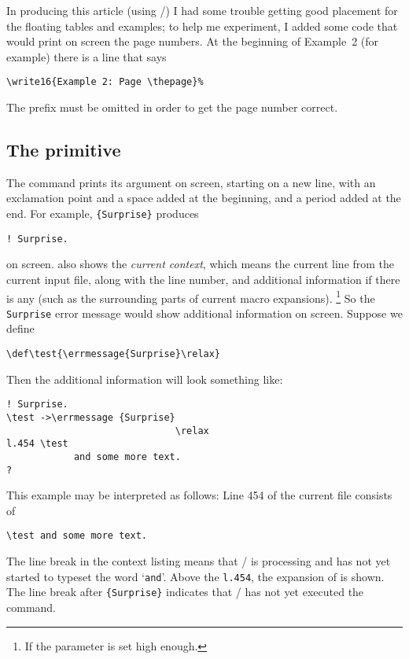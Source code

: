 {In producing this article (using \latex/) I had some trouble getting
good placement for the floating tables and examples; to help me
experiment, I added some code that would print on screen the page
numbers. At the beginning of Example~2 (for example) there is
a line that says
\begin{verbatim}
\write16{Example 2: Page \thepage}%
\end{verbatim}
The  prefix must be omitted in order to
get the page number correct.

\subsection{The  primitive}
\label{ss:errmessage}
The  command prints its argument on screen, starting on a
new line, with an exclamation point and a space added at the beginning,
and a period added at the end.  For example,
\verb|{Surprise}| produces
\begin{verbatim}
! Surprise.
\end{verbatim}
 on screen.   also shows the {\em current context},
which means the current line from the current input file, along with
the line number, and additional information  if there is any (such as
the surrounding parts of current macro expansions).%
\footnote{If the parameter  is set high enough.}
So the {\tt Surprise} error message would show additional information
on screen. Suppose we define
\begin{verbatim}
\def\test{\errmessage{Surprise}\relax}
\end{verbatim}
Then the additional information will look something like:
\begin{verbatim}
! Surprise.
\test ->\errmessage {Surprise}
                              \relax
l.454 \test
            and some more text.
?
\end{verbatim}
This example may be interpreted as follows: Line 454 of the current
file consists of
\begin{verbatim}
\test and some more text.
\end{verbatim}
The line break in the context listing
means that \tex/ is processing  and has not yet
started to typeset the word `\verb"and"'.
Above the \verb"l.454", the expansion
of  is shown. The line break after \verb"{Surprise}"
indicates that \tex/ has not yet executed the  command.

}
